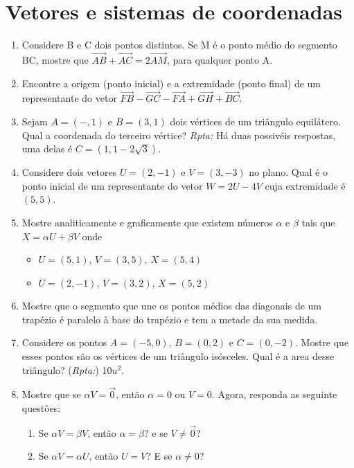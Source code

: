 \documentclass{article}
\theoremstyle{plain}
\theoremstyle{definition}
\theoremstyle{remark}
\begin{document}
\section{Vetores e sistemas de coordenadas} 
  \begin{enumerate}
    \item Considere B e C dois pontos distintos. 
  Se M é o ponto médio do segmento BC, mostre que 
  $\overrightarrow{AB}+\overrightarrow{AC}=2\overrightarrow{AM}$, para qualquer ponto A.
    \item Encontre a origem (ponto inicial) e a extremidade (ponto final)
    de um representante do vetor 
    $\overrightarrow{FB}-\overrightarrow{GC}
    -\overrightarrow{FA}+\overrightarrow{GH}
    +\overrightarrow{BC}$.
    \item Sejam $A=(-,1)$ e $B=(3,1)$ dois vértices de um triângulo equilátero. 
    Qual a coordenada do terceiro vértice? {\it Rpta:} Há duas possivéis respostas, uma delas é $C=(1, 1-2\sqrt{3})$.
    \item Considere dois vetores $U=(2,-1)$ e $V=(3,-3)$ no plano. Qual é 
    o ponto inicial de um representante do vetor $W=2U-4V$ cuja
    extremidade é $(5,5)$.
    \item Mostre analiticamente e graficamente que existem números 
    $\alpha$  e $\beta$ tais que $X=\alpha U +\beta V$ onde
     \begin{itemize}
     \item $U=(5,1)$, $V=(3,5)$, $X=(5,4)$
     \item $U=(2,-1)$, $V=(3,2)$, $X=(5,2)$
     \end{itemize}         
    \item Mostre que o segmento que une os pontos médios das diagonais de um trapézio é paralelo à base do trapézio e tem a metade da sua medida.
    \item Considere os pontos $A=(-5,0)$, $B=(0,2)$ e $C=(0,-2)$. 
    Mostre que esses pontos são os vértices de um triângulo isósceles.
    Qual é a area desse triângulo? ({\it Rpta:}) 10$u^2$.
    \item 
    Mostre que se $\alpha V=\vec{0}$, então $\alpha=0$ ou $V=0$. 
    Agora, responda as seguinte questôes:
        \begin{enumerate}
        \item Se $\alpha V= \beta V$, então $\alpha=\beta$? e se $V \neq \vec{0}$?
        \item Se $\alpha V= \alpha U$, então $U=V$? E se $\alpha\neq 0$?
        \end{enumerate}

\end{enumerate}
\end{document}
